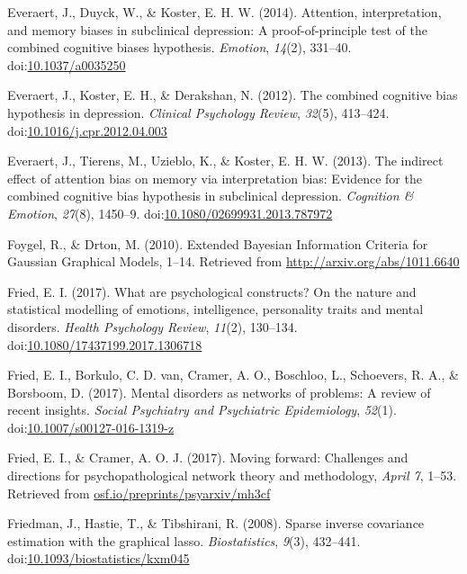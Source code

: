 \documentclass[man,floatsintext]{apa6}
\begin{document}
\leavevmode\hypertarget{ref-Everaert2014}{}%
Everaert, J., Duyck, W., \& Koster, E. H. W. (2014). Attention, interpretation, and memory biases in subclinical depression: A proof-of-principle test of the combined cognitive biases hypothesis. \emph{Emotion}, \emph{14}(2), 331--40. doi:\href{https://doi.org/10.1037/a0035250}{10.1037/a0035250}

\leavevmode\hypertarget{ref-everaert_combined_2012}{}%
Everaert, J., Koster, E. H., \& Derakshan, N. (2012). The combined cognitive bias hypothesis in depression. \emph{Clinical Psychology Review}, \emph{32}(5), 413--424. doi:\href{https://doi.org/10.1016/j.cpr.2012.04.003}{10.1016/j.cpr.2012.04.003}

\leavevmode\hypertarget{ref-Everaert2013}{}%
Everaert, J., Tierens, M., Uzieblo, K., \& Koster, E. H. W. (2013). The indirect effect of attention bias on memory via interpretation bias: Evidence for the combined cognitive bias hypothesis in subclinical depression. \emph{Cognition \& Emotion}, \emph{27}(8), 1450--9. doi:\href{https://doi.org/10.1080/02699931.2013.787972}{10.1080/02699931.2013.787972}

\leavevmode\hypertarget{ref-foygel_extended_2010}{}%
Foygel, R., \& Drton, M. (2010). Extended Bayesian Information Criteria for Gaussian Graphical Models, 1--14. Retrieved from \url{http://arxiv.org/abs/1011.6640}

\leavevmode\hypertarget{ref-fried_what_2017}{}%
Fried, E. I. (2017). What are psychological constructs? On the nature and statistical modelling of emotions, intelligence, personality traits and mental disorders. \emph{Health Psychology Review}, \emph{11}(2), 130--134. doi:\href{https://doi.org/10.1080/17437199.2017.1306718}{10.1080/17437199.2017.1306718}

\leavevmode\hypertarget{ref-fried_mental_2017}{}%
Fried, E. I., Borkulo, C. D. van, Cramer, A. O., Boschloo, L., Schoevers, R. A., \& Borsboom, D. (2017). Mental disorders as networks of problems: A review of recent insights. \emph{Social Psychiatry and Psychiatric Epidemiology}, \emph{52}(1). doi:\href{https://doi.org/10.1007/s00127-016-1319-z}{10.1007/s00127-016-1319-z}

\leavevmode\hypertarget{ref-fried_moving_2017}{}%
Fried, E. I., \& Cramer, A. O. J. (2017). Moving forward: Challenges and directions for psychopathological network theory and methodology, \emph{April 7}, 1--53. Retrieved from \url{osf.io/preprints/psyarxiv/mh3cf}

\leavevmode\hypertarget{ref-friedman_sparse_2008}{}%
Friedman, J., Hastie, T., \& Tibshirani, R. (2008). Sparse inverse covariance estimation with the graphical lasso. \emph{Biostatistics}, \emph{9}(3), 432--441. doi:\href{https://doi.org/10.1093/biostatistics/kxm045}{10.1093/biostatistics/kxm045}
\end{document}
